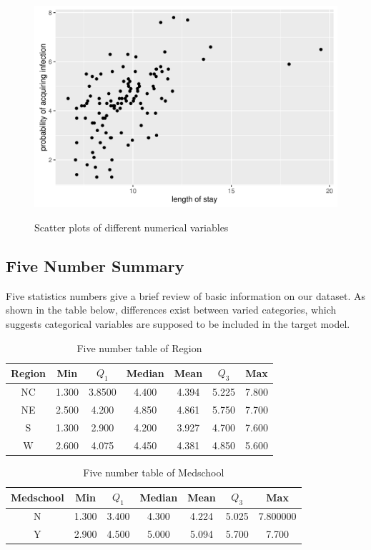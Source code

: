 \documentclass[a4paper,11pt,onecolumn,twoside]{article}
\begin{document}
\begin{figure}[H]
{\begin{minipage}[b]{0.55\textwidth}
			\includegraphics[width=1\textwidth,height=0.3\textheight]{scatter_plot_length.png} \\
		\end{minipage}
	}
\caption{Scatter plots of different numerical variables}
\end{figure}
\subsection{Five Number Summary}
Five statistics numbers give a brief review of basic information on our dataset. As shown in the table below, differences exist between varied categories, which suggests categorical variables are supposed to be included in the target model.
 \begin{table}[H]
	\centering
	\begin{tabular}{ccccccc}
		\midrule[1.5pt]
        Region &Min &$Q_1$ &Median&Mean &$Q_3$ &Max\\
        \hline
       NC   & 1.300       &3.8500     &4.400   &4.394      &5.225   &7.800\\
      NE    &2.500       &4.200     &4.850   &4.861      &5.750  &7.700\\
       S    &1.300       &2.900      &4.200    &3.927       &4.700  &7.600\\
      W    &2.600       &4.075      &4.450   &4.381      &4.850    &5.600\\
        
		\midrule[1.5pt]
	\end{tabular}
	\caption{Five number table of Region }
\end{table}
 \begin{table}[H]
	\centering
	\begin{tabular}{ccccccc}
		\midrule[1.5pt]
		Medschool &Min &$Q_1$ &Median&Mean &$Q_3$ &Max\\
		\hline
    N    &1.300       &3.400     &4.300  &4.224      &5.025    &7.800000\\
     Y    &2.900     & 4.500    & 5.000    &5.094       &5.700    &7.700\\
		\midrule[1.5pt]
	\end{tabular}
	\caption{Five number table of Medschool}
\end{table}
\end{document}
